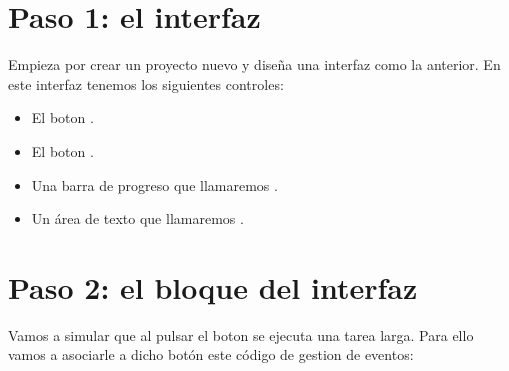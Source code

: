 \documentclass[letterpaper,10pt,spanish]{sphinxmanual}
\begin{document}
\section{Paso 1: el interfaz}
\label{\detokenize{textos/anexo_hilos_con_swing:paso-1-el-interfaz}}
Empieza por crear un proyecto nuevo y diseña una interfaz como la anterior. En este interfaz tenemos los siguientes controles:
\begin{itemize}
\item {} 
El boton .

\item {} 
El boton .

\item {} 
Una barra de progreso que llamaremos .

\item {} 
Un área de texto que llamaremos .

\end{itemize}


\section{Paso 2: el bloque del interfaz}
\label{\detokenize{textos/anexo_hilos_con_swing:paso-2-el-bloque-del-interfaz}}
Vamos a simular que al pulsar el boton  se ejecuta una tarea larga. Para ello vamos a asociarle a dicho botón este código de gestion de eventos:

\begin{sphinxVerbatim}[commandchars=\\\{\}]
    
     
        
         
            
         
     
\end{sphinxVerbatim}
\end{document}
